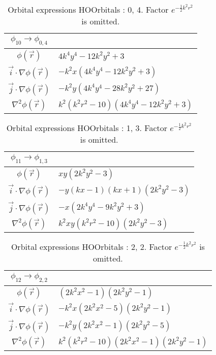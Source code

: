 \clearpage

\begin{table}
\begin{center}
\begin{tabular}{c|l}
$\phi_{10} \rightarrow \phi_{0, 4}$\\
\hline
$\phi(\vec r)$ & $4 k^{4} y^{4} - 12 k^{2} y^{2} + 3$\\
\hline
$\vec i\cdot \nabla \phi(\vec r)$ & $- k^{2} x \left(4 k^{4} y^{4} - 12 k^{2} y^{2} + 3\right)$\\
$\vec j\cdot \nabla \phi(\vec r)$ & $- k^{2} y \left(4 k^{4} y^{4} - 28 k^{2} y^{2} + 27\right)$\\
\hline
$\nabla^2 \phi(\vec r)$ & $k^{2} \left(k^{2} r^{2} -10\right) \left(4 k^{4} y^{4} - 12 k^{2} y^{2} + 3\right)$\\
\end{tabular}
\caption{Orbital expressions HOOrbitals : 0, 4. Factor $e^{- \frac{1}{2} k^{2} r^{2}}$ is omitted.}
\end{center}
\end{table}


\begin{table}
\begin{center}
\begin{tabular}{c|l}
$\phi_{11} \rightarrow \phi_{1, 3}$\\
\hline
$\phi(\vec r)$ & $x y \left(2 k^{2} y^{2} -3\right)$\\
\hline
$\vec i\cdot \nabla \phi(\vec r)$ & $- y \left(k x -1\right) \left(k x + 1\right) \left(2 k^{2} y^{2} -3\right)$\\
$\vec j\cdot \nabla \phi(\vec r)$ & $- x \left(2 k^{4} y^{4} - 9 k^{2} y^{2} + 3\right)$\\
\hline
$\nabla^2 \phi(\vec r)$ & $k^{2} x y \left(k^{2} r^{2} -10\right) \left(2 k^{2} y^{2} -3\right)$\\
\end{tabular}
\caption{Orbital expressions HOOrbitals : 1, 3. Factor $e^{- \frac{1}{2} k^{2} r^{2}}$ is omitted.}
\end{center}
\end{table}


\begin{table}
\begin{center}
\begin{tabular}{c|l}
$\phi_{12} \rightarrow \phi_{2, 2}$\\
\hline
$\phi(\vec r)$ & $\left(2 k^{2} x^{2} -1\right) \left(2 k^{2} y^{2} -1\right)$\\
\hline
$\vec i\cdot \nabla \phi(\vec r)$ & $- k^{2} x \left(2 k^{2} x^{2} -5\right) \left(2 k^{2} y^{2} -1\right)$\\
$\vec j\cdot \nabla \phi(\vec r)$ & $- k^{2} y \left(2 k^{2} x^{2} -1\right) \left(2 k^{2} y^{2} -5\right)$\\
\hline
$\nabla^2 \phi(\vec r)$ & $k^{2} \left(k^{2} r^{2} -10\right) \left(2 k^{2} x^{2} -1\right) \left(2 k^{2} y^{2} -1\right)$\\
\end{tabular}
\caption{Orbital expressions HOOrbitals : 2, 2. Factor $e^{- \frac{1}{2} k^{2} r^{2}}$ is omitted.}
\end{center}
\end{table}


